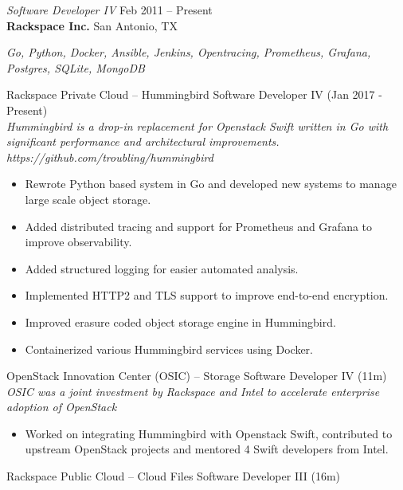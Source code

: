 \documentclass[margin,line]{resume}
\begin{document}
\begin{resume}
{\sl Software Developer IV } \hfill
     Feb 2011 -- Present\\
     \textbf{Rackspace Inc.} \hfill
     San Antonio, TX\\[4pt]
{\small\centering\textit{Go, Python, Docker, Ansible, Jenkins, Opentracing, Prometheus, Grafana, Postgres, SQLite, MongoDB}\par}\vspace*{-\baselineskip}
\vspace{4pt}
{\small Rackspace Private Cloud -- Hummingbird  \hfill  Software Developer IV (Jan 2017 - Present)}\\
{\small\textit{Hummingbird is a drop-in replacement for Openstack
Swift written in Go with significant performance and architectural improvements. https://github.com/troubling/hummingbird}}
\begin{itemize} \itemsep -2pt %
\small\item Rewrote Python based system in Go and developed new systems to manage large scale object storage.
\small\item Added distributed tracing and support for Prometheus and Grafana to improve observability.
\small\item Added structured logging for easier automated analysis.
\small\item Implemented HTTP2 and TLS support to improve end-to-end encryption.
\small\item Improved erasure coded object storage engine in Hummingbird.
\small\item Containerized various Hummingbird services using Docker.
\end{itemize}\vspace*{-\baselineskip} %
\vspace{4pt}
{\small OpenStack Innovation Center (OSIC) -- Storage  \hfill  Software Developer IV (11m)}\\
{\small\textit{OSIC was a joint investment by Rackspace and Intel to accelerate enterprise adoption of OpenStack}}
\begin{itemize} \itemsep -2pt %
\small\item Worked on integrating Hummingbird with Openstack Swift, contributed to upstream OpenStack projects and mentored 4 Swift developers from Intel.
\end{itemize}\vspace*{-\baselineskip} %
\vspace{4pt}
{\small Rackspace Public Cloud -- Cloud Files  \hfill  Software Developer III (16m)}\\

\end{resume}
\end{document}

